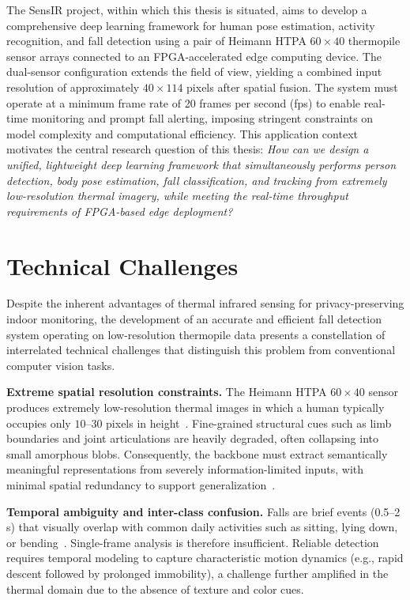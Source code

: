 The SensIR project, within which this thesis is situated, aims to develop a comprehensive deep learning framework for human pose estimation, activity recognition, and fall detection using a pair of Heimann HTPA $60 \times 40$ thermopile sensor arrays connected to an FPGA-accelerated edge computing device. The dual-sensor configuration extends the field of view, yielding a combined input resolution of approximately $40 \times 114$ pixels after spatial fusion. The system must operate at a minimum frame rate of 20 frames per second (fps) to enable real-time monitoring and prompt fall alerting, imposing stringent constraints on model complexity and computational efficiency. This application context motivates the central research question of this thesis: \textit{How can we design a unified, lightweight deep learning framework that simultaneously performs person detection, body pose estimation, fall classification, and tracking from extremely low-resolution thermal imagery, while meeting the real-time throughput requirements of FPGA-based edge deployment?}

\section{Technical Challenges}
\label{sec:intro_challenges}

Despite the inherent advantages of thermal infrared sensing for privacy-preserving indoor monitoring, the development of an accurate and efficient fall detection system operating on low-resolution thermopile data presents a constellation of interrelated technical challenges that distinguish this problem from conventional computer vision tasks.

\textbf{Extreme spatial resolution constraints.} The Heimann HTPA $60 \times 40$ sensor produces extremely low-resolution thermal images in which a human typically occupies only $10$--$30$ pixels in height~\cite{nogas2020fall}. Fine-grained structural cues such as limb boundaries and joint articulations are heavily degraded, often collapsing into small amorphous blobs. Consequently, the backbone must extract semantically meaningful representations from severely information-limited inputs, with minimal spatial redundancy to support generalization~\cite{chen2019drop}.

\textbf{Temporal ambiguity and inter-class confusion.} Falls are brief events (0.5--2 s) that visually overlap with common daily activities such as sitting, lying down, or bending~\cite{fan2017fall,mubashir2013survey}. Single-frame analysis is therefore insufficient. Reliable detection requires temporal modeling to capture characteristic motion dynamics (e.g., rapid descent followed by prolonged immobility), a challenge further amplified in the thermal domain due to the absence of texture and color cues.

